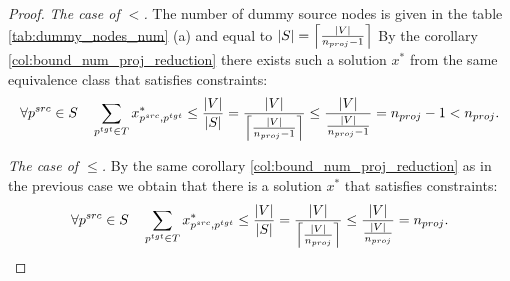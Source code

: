 \begin{proof}
  \textit{The case of \( < \).} The number of dummy source nodes is given in the table \ref{tab:dummy_nodes_num} (a) and equal to
  \( |S| = \left\lceil \frac{|V|}{n_{proj} - 1} \right\rceil \)
  By the corollary \ref{col:bound_num_proj_reduction} there exists such a solution \( x^* \) from the same
  equivalence class that satisfies constraints:
  \[
    \forall p^{src} \in S \quad
    \sum\limits_{p^{tgt} \in T} x^*_{p^{src}, p^{tgt}} \leq \frac{|V|}{|S|} =
    \frac{|V|}{ \left\lceil \frac{|V|}{n_{proj} - 1} \right\rceil} \leq \frac{|V|}{\frac{|V|}{n_{proj} - 1}} =
    n_{proj} - 1 < n_{proj}.
  \]

  \textit{The case of \( \leq \).} By the same corollary \ref{col:bound_num_proj_reduction} as in the previous case
  we obtain that there is a solution \( x^* \) that satisfies constraints:
  \[
    \forall p^{src} \in S \quad
    \sum\limits_{p^{tgt} \in T} x^*_{p^{src}, p^{tgt}} \leq \frac{|V|}{|S|} =
    \frac{|V|}{ \left\lceil \frac{|V|}{n_{proj}} \right\rceil} \leq \frac{|V|}{\frac{|V|}{n_{proj}}} =
    n_{proj} .
  \]


\end{proof}
